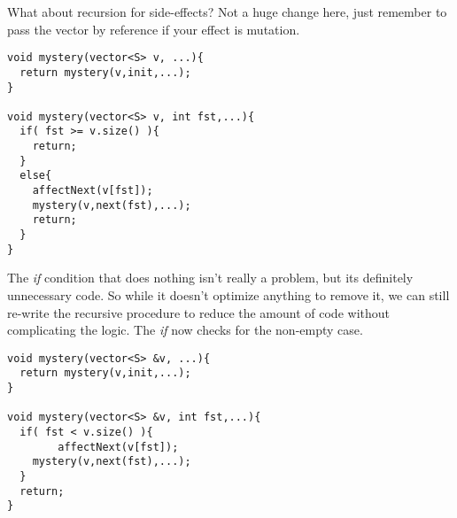 \documentclass[]{tufte-handout}
\begin{document}
What about recursion for side-effects? Not a huge change here, just remember to pass the vector by reference if your effect is mutation.
\begin{verbatim}
void mystery(vector<S> v, ...){
  return mystery(v,init,...);
}

void mystery(vector<S> v, int fst,...){
  if( fst >= v.size() ){
    return;
  }
  else{
    affectNext(v[fst]);
    mystery(v,next(fst),...);
    return;
  }
}
\end{verbatim}

The \textit{if} condition that does nothing isn't really a problem, but its definitely unnecessary code. So while it doesn't optimize anything to remove it, we can still re-write the recursive procedure to reduce the amount of code without complicating the logic.  The \textit{if} now checks for the non-empty case.
\begin{verbatim}
void mystery(vector<S> &v, ...){
  return mystery(v,init,...);
}

void mystery(vector<S> &v, int fst,...){
  if( fst < v.size() ){
    	affectNext(v[fst]);
    mystery(v,next(fst),...);
  }
  return;
}
\end{verbatim}
\end{document}
